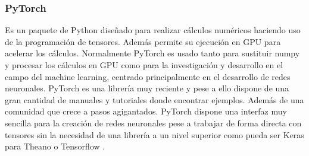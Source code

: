 \subsubsection*{PyTorch}
Es un paquete de Python diseñado para realizar cálculos numéricos haciendo uso de la programación de tensores. Además permite su ejecución en GPU para acelerar los cálculos. Normalmente PyTorch es usado tanto para sustituir numpy y procesar los cálculos en GPU como para la investigación y desarrollo en el campo del machine learning, centrado principalmente en el desarrollo de redes neuronales. PyTorch es una librería muy reciente y pese a ello dispone de una gran cantidad de manuales y tutoriales donde encontrar ejemplos. Además de una comunidad que crece a pasos agigantados. PyTorch dispone una interfaz muy sencilla para la creación de redes neuronales pese a trabajar de forma directa con tensores sin la necesidad de una librería a un nivel superior como pueda ser Keras para Theano o Tensorflow \cite{PyTorch}.